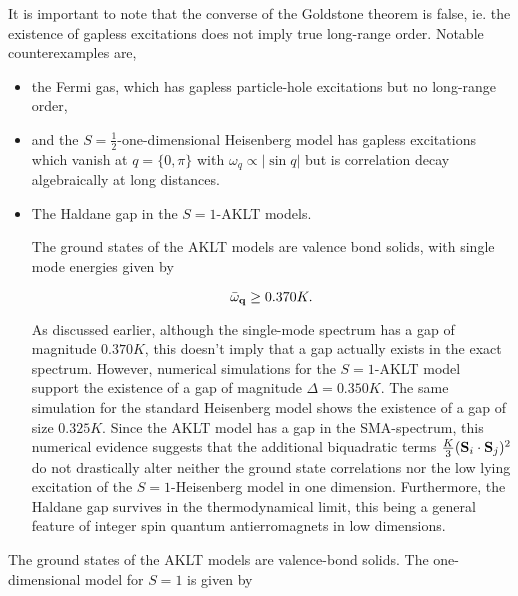 \documentclass{homework}
\begin{document}
\begin{tcolorbox}[colback = yellow, title = Physical Context]

It is important to note that the converse of the Goldstone theorem is false, ie. the existence of gapless excitations does not imply true long-range order. Notable counterexamples are,

\begin{itemize}
    \item the Fermi gas, which has gapless particle-hole excitations but no long-range order,
    \item and the $S= \frac{1}{2}$-one-dimensional Heisenberg model has gapless excitations which vanish at $q = \{0, \pi\}$ with ${\omega}_{q} \propto |\sin q|$ but is correlation decay algebraically at long distances. 
    \item The Haldane gap in the $S=1$-AKLT models. 
          
          The ground states of the AKLT models are valence bond solids, with single mode energies given by 
          
          $$
              \bar{\omega}_{\bf q} \geq 0.370K.
          $$
          
          As discussed earlier, although the single-mode spectrum has a gap of magnitude $0.370K$, this doesn't imply that a gap actually exists in the exact spectrum. However, numerical simulations for the $S=1$-AKLT model support the existence of a gap of magnitude $\Delta = 0.350K$. The same simulation for the standard Heisenberg model shows the existence of a gap of size $0.325K$. Since the AKLT model has a gap in the SMA-spectrum, this numerical evidence suggests that the additional biquadratic terms $\frac{K}{3} ({\bf S}_i \cdot {\bf S}_j)^2$ do not drastically alter neither the ground state correlations nor the low lying excitation of the $S=1$-Heisenberg model in one dimension. Furthermore, the Haldane gap survives in the thermodynamical limit, this being a general feature of integer spin quantum antierromagnets in low dimensions. 
\end{itemize}

\end{tcolorbox}

\clearpage

\iffalse

The ground states of the AKLT models are valence-bond solids. The one-dimensional model for $S = 1$ is given by 
\end{document}
